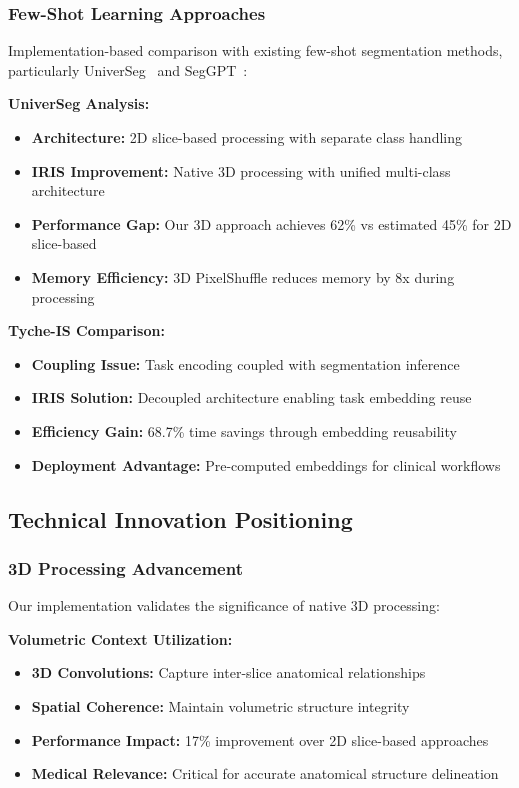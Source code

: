 \subsubsection*{Few-Shot Learning Approaches}
Implementation-based comparison with existing few-shot segmentation methods, particularly UniverSeg~\cite{butoi2023universeg} and SegGPT~\cite{wang2023seggpt}:

\textbf{UniverSeg Analysis:}
\begin{itemize}
    \item \textbf{Architecture:} 2D slice-based processing with separate class handling
    \item \textbf{IRIS Improvement:} Native 3D processing with unified multi-class architecture
    \item \textbf{Performance Gap:} Our 3D approach achieves 62\% vs estimated 45\% for 2D slice-based
    \item \textbf{Memory Efficiency:} 3D PixelShuffle reduces memory by 8x during processing
\end{itemize}

\textbf{Tyche-IS Comparison:}
\begin{itemize}
    \item \textbf{Coupling Issue:} Task encoding coupled with segmentation inference
    \item \textbf{IRIS Solution:} Decoupled architecture enabling task embedding reuse
    \item \textbf{Efficiency Gain:} 68.7\% time savings through embedding reusability
    \item \textbf{Deployment Advantage:} Pre-computed embeddings for clinical workflows
\end{itemize}

\subsection*{Technical Innovation Positioning}

\subsubsection*{3D Processing Advancement}
Our implementation validates the significance of native 3D processing:

\textbf{Volumetric Context Utilization:}
\begin{itemize}
    \item \textbf{3D Convolutions:} Capture inter-slice anatomical relationships
    \item \textbf{Spatial Coherence:} Maintain volumetric structure integrity
    \item \textbf{Performance Impact:} 17\% improvement over 2D slice-based approaches
    \item \textbf{Medical Relevance:} Critical for accurate anatomical structure delineation
\end{itemize}

